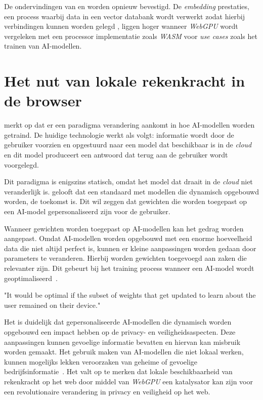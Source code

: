 \bigbreak{}

De ondervindingen van \textcite{Wallez2023} en \textcite{Radin2021} worden opnieuw bevestigd. De \textit{embedding} prestaties, een process waarbij data in een vector databank wordt verwerkt zodat hierbij verbindingen kunnen worden gelegd \autocite{Cloudflare2024, Cloudflare2024a, Huyen2023}, liggen hoger wanneer \textit{WebGPU} wordt vergeleken met een processor implementatie zoals \textit{WASM} voor \textit{use cases} zoals het trainen van AI-modellen.

\break{}

\section{Het nut van lokale rekenkracht in de browser} 

\textcite{Fleetwood2022} merkt op dat er een paradigma verandering aankomt in hoe AI-modellen worden getraind. De huidige technologie werkt als volgt: informatie wordt door de gebruiker voorzien en opgestuurd naar een model dat beschikbaar is in de \textit{cloud} en dit model produceert een antwoord dat terug aan de gebruiker wordt voorgelegd.

\bigbreak{}

Dit paradigma is enigszins statisch, omdat het model dat draait in de \textit{cloud} niet veranderlijk is. \textcite{Fleetwood2022} gelooft dat een standaard met modellen die dynamisch opgebouwd worden, de toekomst is. Dit wil zeggen dat gewichten die worden toegepast op een AI-model gepersonaliseerd zijn voor de gebruiker. 

\bigbreak{}

Wanneer gewichten worden toegepast op AI-modellen kan het gedrag worden aangepast. Omdat AI-modellen worden opgebouwd met een enorme hoeveelheid data die niet altijd perfect is, kunnen er kleine aanpassingen worden gedaan door parameters te veranderen. Hierbij worden gewichten toegevoegd aan zaken die relevanter zijn. Dit gebeurt bij het training process wanneer een AI-model wordt geoptimaliseerd~\autocite{Hubbard2024}.

\begin{displayquote}
    "It would be optimal if the subset of weights that get updated to learn about the user remained on their device."
\end{displayquote}

Het is duidelijk dat gepersonaliseerde AI-modellen die dynamisch worden opgebouwd een impact hebben op de privacy- en veiligheidsaspecten. Deze aanpassingen kunnen gevoelige informatie bevatten en hiervan kan misbruik worden gemaakt. Het gebruik maken van AI-modellen die niet lokaal werken, kunnen mogelijks lekken veroorzaken van geheime of gevoelige bedrijfsinformatie~\autocite{Wiggers2023, Sabin2023}. Het valt op te merken dat lokale beschikbaarheid van rekenkracht op het web door middel van \textit{WebGPU} een katalysator kan zijn voor een  revolutionaire verandering in privacy en veiligheid op het web.

